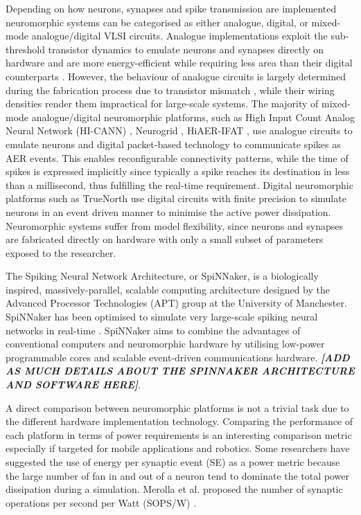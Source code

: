 Depending on how neurons, synapses and spike transmission are implemented neuromorphic systems can be categorised as either analogue, digital, or mixed-mode analogue/digital VLSI circuits. Analogue implementations exploit the sub-threshold transistor dynamics to emulate neurons and synapses directly on hardware \citep{giacom} and are more energy-efficient while requiring less area than their digital counterparts \citep{temamanalogdigital}. However, the behaviour of analogue circuits is largely determined during the fabrication process due to transistor mismatch \citep{giacom,analoguemismatch,bernabeDACsynapses}, while their wiring densities render them impractical for large-scale systems. The majority of mixed-mode analogue/digital neuromorphic platforms, such as High Input Count Analog Neural Network (HI-CANN) \citep{Schemmel_etal10}, Neurogrid \citep{Benjamin_etal14}, HiAER-IFAT \citep{gert}, use analogue circuits to emulate neurons and digital packet-based technology to communicate spikes as AER events. This enables reconfigurable connectivity patterns, while the time of spikes is expressed implicitly since typically a spike reaches its destination in less than a millisecond, thus fulfilling the real-time requirement. Digital neuromorphic platforms such as TrueNorth \citep{Merolla08082014} use digital circuits with finite precision to simulate neurons in an event driven manner to minimise the active power dissipation. Neuromorphic systems suffer from model flexibility, since neurons and synapses are fabricated directly on hardware with only a small subset of parameters exposed to the researcher. 

The Spiking Neural Network Architecture, or SpiNNaker, is a biologically inspired, massively-parallel, scalable computing architecture designed by the Advanced Processor Technologies (APT) group at the University of Manchester. SpiNNaker has been optimised to simulate very large-scale spiking neural networks in real-time \citep{spiNNakerProject}. SpiNNaker aims to combine the advantages of conventional computers and neuromorphic hardware by utilising low-power programmable cores and scalable event-driven communications hardware. \textit{\textbf{[ADD AS MUCH DETAILS ABOUT THE SPINNAKER ARCHITECTURE AND SOFTWARE HERE]}}. 

A direct comparison between neuromorphic platforms is not a trivial task due to the different hardware implementation technology. Comparing the performance of each platform in terms of power requirements is an interesting comparison metric especially if targeted for mobile applications and robotics. Some researchers have suggested the use of energy per synaptic event (SE) \citep{Sharp2012110,strometal} as a power metric because the large number of fan in and out of a neuron tend to dominate the total power dissipation during a simulation. Merolla et al. proposed the number of synaptic operations per second per Watt (SOPS/W) \citep{Merolla08082014}. 

